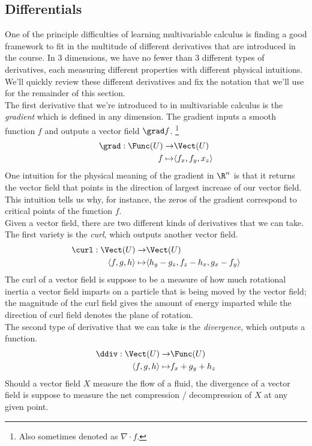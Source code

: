 \subsection{Differentials}
One of the principle difficulties of learning multivariable calculus is finding a good framework to fit in the multitude of different derivatives that are introduced in the course. In 3 dimensions, we have no fewer than 3 different types of derivatives, each measuring different properties with different physical intuitions. We'll quickly review these different derivatives and fix the notation that we'll use for the remainder of this section. \\
The first derivative that we're introduced to in multivariable calculus is the \emph{gradient} which is defined in any dimension. The gradient inputs a smooth function $f$ and outputs a vector field $\grad f$. \footnote{Also sometimes denoted as $\nabla\cdot f.$}
\begin{align*}
\grad: \Func(U)\to& \Vect(U)\\
f\mapsto &\langle f_x, f_y, x_z\rangle 
\end{align*}
One intuition for the physical meaning of the gradient in $\R^n$ is that it returns the vector field that points in the direction of largest increase of our vector field. This intuition tells us why, for instance, the zeros of the gradient correspond to critical points of the function $f$. \\
Given a vector field, there are two different kinds of derivatives that we can take. The first variety is the \emph{curl}, which outputs another vector field. 
\begin{align*}
\curl: \Vect(U)\to&\Vect(U)\\
\langle f, g, h\rangle \mapsto & \langle h_y-g_z, f_z-h_x, g_x-f_y\rangle
\end{align*}
The curl of a vector field is suppose to be a measure of how much rotational inertia a vector field imparts on a particle that is being moved by the vector field; the magnitude of the curl field gives the amount of energy imparted while the direction of curl field denotes the plane of rotation. \\
The second type of derivative that we can take is the \emph{divergence}, which outputs a function. 
\begin{align*}
\ddiv: \Vect(U)\to&\Func(U)\\
\langle f, g, h\rangle \mapsto& f_x+g_y+h_z
\end{align*}
Should a vector field $X$ measure the flow of a fluid, the divergence of a vector field is suppose to measure the net compression / decompression of $X$ at any given point. \\
